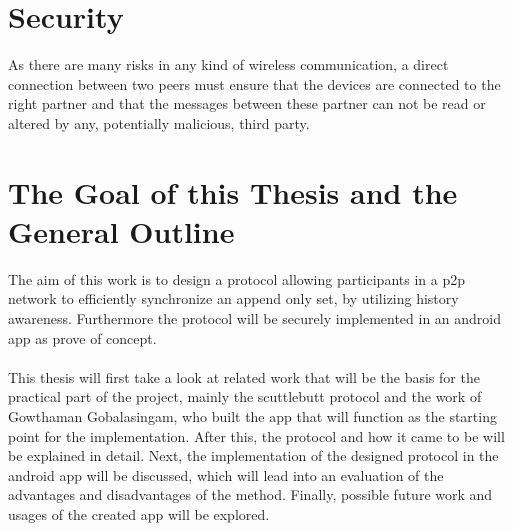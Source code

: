 \section{Security}

As there are many risks in any kind of wireless communication, a direct connection between two peers must ensure that the devices are connected to the right partner and that the messages between these partner can not be read or altered by any, potentially malicious, third party.

\section{The Goal of this Thesis and the General Outline}

The aim of this work is to design a protocol allowing participants in a p2p network to efficiently synchronize an append only set, by utilizing history awareness. Furthermore the protocol will be securely implemented in an android app as prove of concept.
\\
\\
This thesis will first take a look at related work that will be the basis for the practical part of the project, mainly the scuttlebutt protocol and the work of Gowthaman Gobalasingam, who built the app that will function as the starting point for the implementation. After this, the protocol and how it came to be will be explained in detail. Next, the implementation of the designed protocol in the android app will be discussed, which will lead into an evaluation of the advantages and disadvantages of the method. Finally, possible future work and usages of the created app will be explored. 
